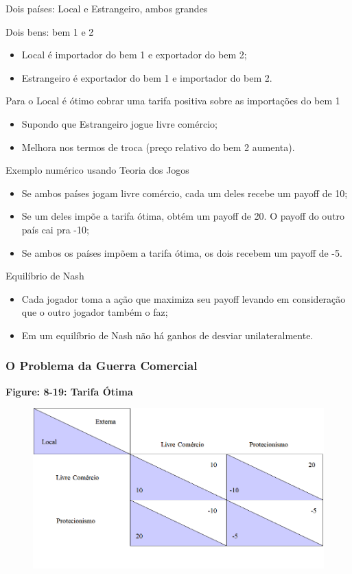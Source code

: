 \documentclass[a4paper,12pt]{article}[abntex2]
\begin{document}
Dois países: Local e Estrangeiro, ambos grandes

Dois bens: bem 1 e 2
\begin{itemize}
  \item Local é importador do bem 1 e exportador do bem 2;
  \item Estrangeiro é exportador do bem 1 e importador do bem 2.
\end{itemize}

Para o Local é ótimo cobrar uma tarifa positiva sobre as importações do bem 1
\begin{itemize}
  \item Supondo que Estrangeiro jogue livre comércio;
  \item Melhora nos termos de troca (preço relativo do bem 2 aumenta).
\end{itemize}

Exemplo numérico usando Teoria dos Jogos

\begin{itemize}
  \item Se ambos países jogam livre comércio, cada um deles recebe um payoff de 10;
  \item Se um deles impõe a tarifa ótima, obtém um payoff de 20. O payoff do outro país cai pra -10;
  \item Se ambos os países impõem a tarifa ótima, os dois recebem um payoff de -5.
\end{itemize}

Equilíbrio de Nash

\begin{itemize}
  \item Cada jogador toma a ação que maximiza seu payoff levando em consideração que o outro jogador também o faz;
  \item Em um equilíbrio de Nash não há ganhos de desviar unilateralmente.
\end{itemize}

\subsubsection{\textbf{O Problema da Guerra Comercial}}
\textbf{Figure: 8-19: Tarifa Ótima}
\begin{figure}[H]
    \centering
    \includegraphics[width=0.7\linewidth]{Imagens/a22i2.png}
\end{figure}
\end{document}
